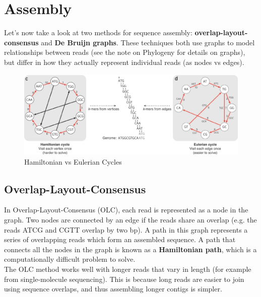 \documentclass[12pt]{article}
\begin{document}
\section{Assembly}
Let's now take a look at two methods for sequence assembly: \textbf{overlap-layout-consensus} and \textbf{De Bruijn graphs}. These techniques both use graphs to model relationships between reads (see the note on Phylogeny for details on graphs), but differ in how they actually represent individual reads (as nodes vs edges).
\begin{figure}[h!]
    \centering
    \includegraphics[width=\linewidth]{cycles.png}
    \caption{Hamiltonian vs Eulerian Cycles}
    \label{fig:cycle}
\end{figure}
\subsection{Overlap-Layout-Consensus}
In Overlap-Layout-Consensus (OLC), each read is represented as a node in the graph. Two nodes are connected by an edge if the reads share an overlap (e.g. the reads ATCG and CGTT overlap by two bp). A path in this graph represents a series of overlapping reads which form an assembled sequence. A path that connects all the nodes in the graph is known as a \textbf{Hamiltonian path}, which is a computationally difficult problem to solve.\\[10pt]
The OLC method works well with longer reads that vary in length (for example from single-molecule sequencing). This is because long reads are easier to join using sequence overlaps, and thus assembling longer contigs is simpler.
\end{document}
